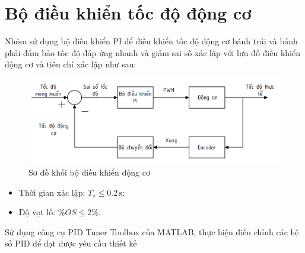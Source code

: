      \section{Bộ điều khiển tốc độ động cơ}
          \hspace*{0.6cm}Nhóm sử dụng bộ điều khiển PI để điều khiển tốc độ động cơ bánh trái và bánh phải
          đảm bảo tốc độ đáp ứng nhanh và giảm sai số xác lập với lưu đồ điều khiển động
          cơ và tiêu chí xác lập như sau:
               \begin{figure}[H]
                    \centering
                    \includegraphics[width=1\textwidth]{pictures/chapter6/PI_controller.png}
                    \caption{Sơ đồ khối bộ điều khiển động cơ}
                    \label{PI_controller}
               \end{figure}
          \begin{itemize}
               \item Thời gian xác lập: $T_s \leq 0.2 \,\mathrm{s}$;
               \item Độ vọt lố: $\%OS \leq 2 \%$.
          \end{itemize}
          \hspace*{0.6cm}Sử dụng công cụ PID Tuner Toolbox của MATLAB, thực hiện điều chỉnh các hệ số PID để đạt được yêu cầu thiết kế
